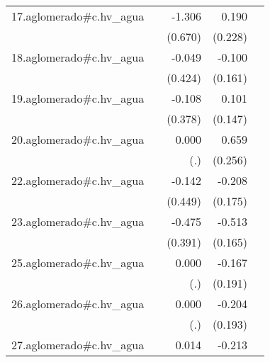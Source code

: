 {\begin{longtable}{l*{4}{D{.}{.}{-1}}}
\addlinespace
17.aglomerado#c.hv\_agua&                     &      -1.306         &       0.190         &                     \\
            &                     &     (0.670)         &     (0.228)         &                     \\
\addlinespace
18.aglomerado#c.hv\_agua&                     &      -0.049         &      -0.100         &                     \\
            &                     &     (0.424)         &     (0.161)         &                     \\
\addlinespace
19.aglomerado#c.hv\_agua&                     &      -0.108         &       0.101         &                     \\
            &                     &     (0.378)         &     (0.147)         &                     \\
\addlinespace
20.aglomerado#c.hv\_agua&                     &       0.000         &       0.659\sym{**} &                     \\
            &                     &         (.)         &     (0.256)         &                     \\
\addlinespace
22.aglomerado#c.hv\_agua&                     &      -0.142         &      -0.208         &                     \\
            &                     &     (0.449)         &     (0.175)         &                     \\
\addlinespace
23.aglomerado#c.hv\_agua&                     &      -0.475         &      -0.513\sym{**} &                     \\
            &                     &     (0.391)         &     (0.165)         &                     \\
\addlinespace
25.aglomerado#c.hv\_agua&                     &       0.000         &      -0.167         &                     \\
            &                     &         (.)         &     (0.191)         &                     \\
\addlinespace
26.aglomerado#c.hv\_agua&                     &       0.000         &      -0.204         &                     \\
            &                     &         (.)         &     (0.193)         &                     \\
\addlinespace
27.aglomerado#c.hv\_agua&                     &       0.014         &      -0.213         &                     \\

\end{longtable}}
